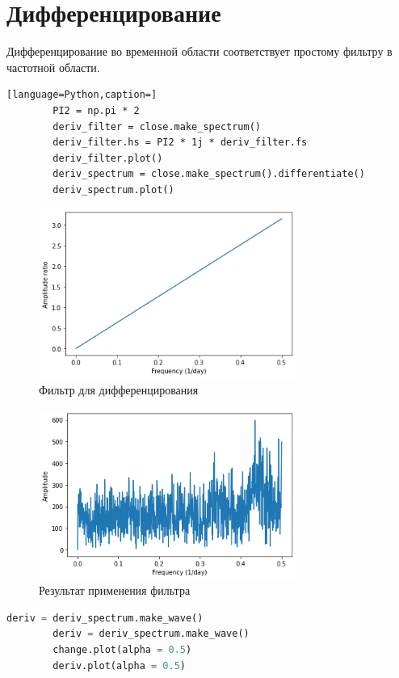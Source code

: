 \documentclass[a4paper, 12pt]{report}
\begin{document}
	\chapter{Дифференцирование}
	Дифференцирование во временной области соответствует простому фильтру в частотной области.
	\begin{lstlisting}[language=Python,caption=]
		PI2 = np.pi * 2
		deriv_filter = close.make_spectrum()
		deriv_filter.hs = PI2 * 1j * deriv_filter.fs
		deriv_filter.plot()
		deriv_spectrum = close.make_spectrum().differentiate()
		deriv_spectrum.plot()
	\end{lstlisting}
	\begin{figure}[H]
		\centering
		\includegraphics[width=0.75\textwidth]{dif1.png}
		\caption{Фильтр для дифференцирования}
		\label{fig:dif1}
	\end{figure}
	\begin{figure}[H]
		\centering
		\includegraphics[width=0.75\textwidth]{dif2.png}
		\caption{Результат применения фильтра}
		\label{fig:dif2}
	\end{figure}
	\begin{lstlisting}[language=Python,caption=Сравнение двух методов]
		deriv = deriv_spectrum.make_wave()
		deriv = deriv_spectrum.make_wave()
		change.plot(alpha = 0.5)
		deriv.plot(alpha = 0.5)
	\end{lstlisting}
\end{document}
